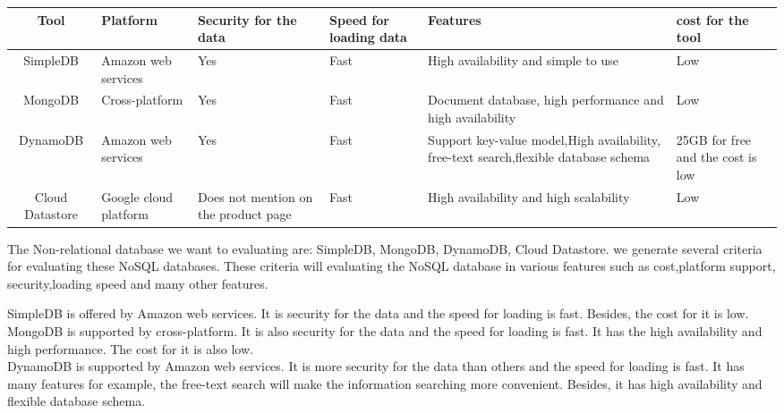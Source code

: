 \documentclass[10pt,draftclsnofoot,onecolumn,journal,compsoc]{IEEEtran}
\begin{document}
        \begin{table}[ht]
        \begin{tabular}{|c|p{2cm}|p{2cm}|p{1cm}|p{5cm}|p{3cm}|}
            \hline
            \textbf{Tool} & \textbf{Platform} & \textbf{Security for the data} & \textbf{Speed for loading data} & \textbf{Features} & \textbf{cost for the tool}\\
            \hline
            SimpleDB & Amazon web services & Yes & Fast & High availability and simple to use & Low \\
            \hline
            MongoDB & Cross-platform & Yes & Fast & Document database, high performance and high availability & Low \\
            \hline
            DynamoDB & Amazon web services & Yes & Fast & Support key-value model,High availability, free-text search,flexible database schema & 25GB for free and the cost is low\\
            \hline
             Cloud Datastore & Google cloud platform & Does not mention on the product page & Fast & High availability and high scalability & Low\\
            \hline
        \end{tabular}
        \end{table}

        \noindent The Non-relational database we want to evaluating are: SimpleDB, MongoDB, DynamoDB, Cloud Datastore. we generate several criteria for evaluating these NoSQL databases. These criteria will evaluating the NoSQL database in various features such as cost,platform support, security,loading speed and many other features. 

        \noindent SimpleDB is offered by Amazon web services. It is security for the data and the speed for loading is fast. Besides, the cost for it is low.\\

        \noindent MongoDB is supported by cross-platform. It is also security for the data and the speed for loading is fast. It has the high availability and high performance. The cost for it is also low.\\

        \noindent DynamoDB is supported by Amazon web services. It is more security for the data than others and the speed for loading is fast. It has many features for example, the free-text search will make the information searching more convenient\cite{W5}. Besides, it has high availability and flexible database schema.\\
\end{document}

